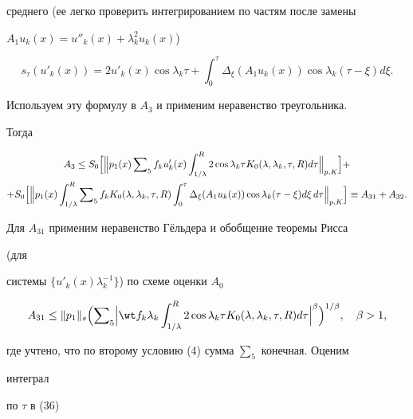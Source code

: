 {среднего (ее легко проверить интегрированием по частям после замены


$A_1u_k(x)=u''_k(x)+\lambda^2_ku_k(x)$)


$$


s_\tau(u'_k(x))=2u'_k(x)\cos\lambda_k\tau+


\int^\tau_0\Delta_\xi(A_1u_k(x))\cos\lambda_k(\tau-\xi)d\xi.


$$


Используем эту формулу в $A_3$ и применим неравенство треугольника.


Тогда


\begin{multline}


A_3\le S_0\Bigl[\Bigl\|p_1(x)\sumn_5 f_k u'_k(x)


\int^R_{1/\lambda}2\cos\lambda_k\tau K_0


(\lambda,\lambda_k,\tau,R)d\tau\Bigr\|_{p,K}\Bigr]+\\


+S_0\Bigl[\Bigl\|p_1(x)\int^R_{1/\lambda}\sumn_5 f_k K_0


(\lambda,\lambda_k,\tau,R)\int^\tau_0\Delta_\xi


(A_1 u_k(x))\cos\lambda_k(\tau-\xi)d\xi\,d\tau


\Bigr\|_{p,K}\Bigr]\equiv A_{31}+A_{32}.


\end{multline}





Для $A_{31}$ применим неравенство Г\"ельдера и обобщение теоремы Рисса


(для


системы $\{u'_k(x)\lambda^{-1}_k\}$) по схеме оценки $A_0$


\begin{equation}


A_{31}\le\|p_1\|_s\Bigl(\sumn_5\Bigl|\wt f_k\lambda_k


\int^R_{1/\lambda}2\cos\lambda_k\tau K_0


(\lambda,\lambda_k,\tau,R)d\tau\Bigr|^\beta\Bigr)^{1/\beta},


\quad \beta>1,


\end{equation}


где учтено, что по второму условию (4) сумма $\sum_5$ конечная. Оценим


интеграл


по $\tau$ в (36)


\begin{multline}



\end{multline}}
